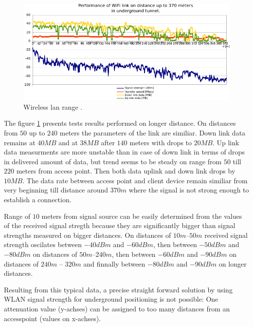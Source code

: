 \documentclass[../main.tex]{subfiles}
\begin{document}
\begin{figure}[!htbp]
\includegraphics[width=\textwidth]{pictures/wifi_link_long.pdf}
\centering
\caption{Wireless lan range \cite{Thesis_CM}. }
\label{fig:wifi_link_long}
\end{figure}

The figure \ref{fig:wifi_link_long} presents tests results performed on longer distance. On distances from $50$ up to $240$ meters the parameters of the link are similiar. Down link data remains at $40 MB$ and at $38 MB$ after $140$ meters with drops to $20 MB$. Up link data measurments are more unstable than in case of down link in terms of drops in delivered amount of data, but trend seems to be steady on range from $50$ till $220$ meters from access point. Then both data uplink and down link drops by $10 MB$. The data rate between access point and client device remain similiar from very beginning till distance around $370m$ where the signal is not strong enough to establish a connection.

Range of $10$ meters from signal source can be easily determined from the values of the received signal stregth because they are significantly bigger than signal strengths measured on bigger distances. On distances of $10m$--$50m$ received signal strength oscilates between $-40 dBm$ and $-60 dBm$, then between $-50dBm$ and $-80 dBm$ on distances of $50m$--$240m$, then between $-60dBm$ and $-90 dBm$ on distances of $240m$ -- $320m$ and finnally between $-80dBm$ and $-90dBm$ on longer distances.

Resulting from this typical data, a precise straight forward solution by using WLAN signal strength for underground positioning is not possible: One attenuation value (y-achses) can be assigned to too many distances from an accesspoint (values on x-achses).
\end{document}
